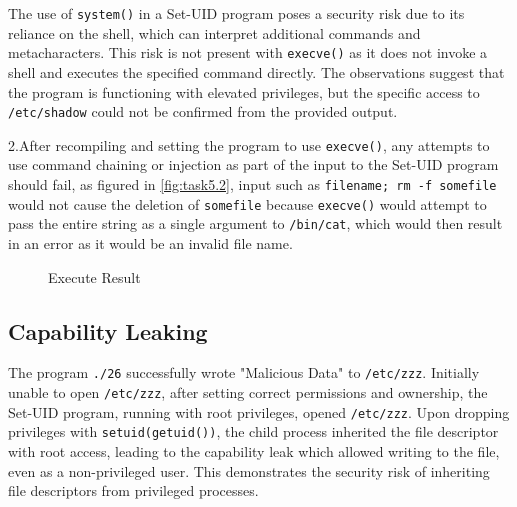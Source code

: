 \documentclass[a4paper,11pt]{article}
\begin{document}
The use of \verb|system()| in a Set-UID program poses a security risk due to its reliance on the shell, which can interpret additional commands and metacharacters. This risk is not present with \verb|execve()| as it does not invoke a shell and executes the specified command directly. The observations suggest that the program is functioning with elevated privileges, but the specific access to \verb|/etc/shadow| could not be confirmed from the provided output.

2.After recompiling and setting the program to use \verb|execve()|, any attempts to use command chaining or injection as part of the input to the Set-UID program should fail, as figured in \ref{fig:task5.2}, input such as \verb|filename; rm -f somefile| would not cause the deletion of \verb|somefile| because \verb|execve()| would attempt to pass the entire string as a single argument to \verb|/bin/cat|, which would then result in an error as it would be an invalid file name.
\begin{figure}[h]
    \centering
    \hfill
    \hfill
    \caption{Execute Result}\label{fig:task5}
\end{figure}



\subsection{Capability Leaking}
The program \verb|./26| successfully wrote "Malicious Data" to \verb|/etc/zzz|. Initially unable to open \verb|/etc/zzz|, after setting correct permissions and ownership, the Set-UID program, running with root privileges, opened \verb|/etc/zzz|. Upon dropping privileges with \verb|setuid(getuid())|, the child process inherited the file descriptor with root access, leading to the capability leak which allowed writing to the file, even as a non-privileged user. This demonstrates the security risk of inheriting file descriptors from privileged processes.
\end{document}
